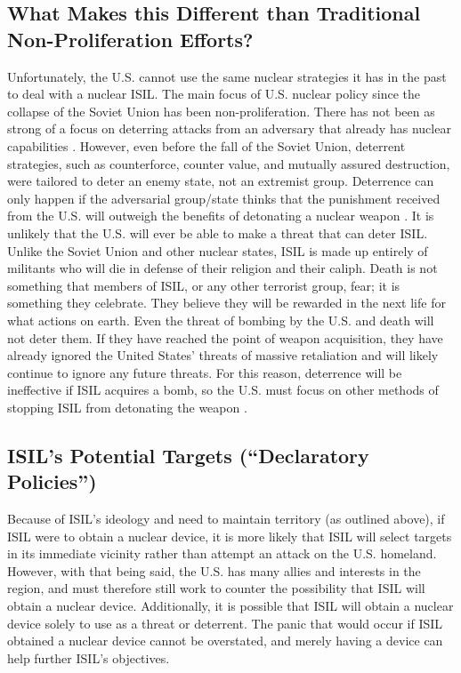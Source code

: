 \documentclass{report}
\begin{document}
\subsection{What Makes this Different than Traditional Non-Proliferation Efforts?}

Unfortunately, the U.S. cannot use the same nuclear strategies it has in the past to deal with a nuclear ISIL.  The main focus of U.S. nuclear policy since the collapse of the Soviet Union has been non-proliferation.  There has not been as strong of a focus on deterring attacks from an adversary that already has nuclear capabilities \cite{Bracken2013}. However, even before the fall of the Soviet Union, deterrent strategies, such as counterforce, counter value, and mutually assured destruction, were tailored to deter an enemy state, not an extremist group.  Deterrence can only happen if the adversarial group/state thinks that the punishment received from the U.S. will outweigh the benefits of detonating a nuclear weapon \cite{kaplan1991wizards}.  It is unlikely that the U.S. will ever be able to make a threat that can deter ISIL.  Unlike the Soviet Union and other nuclear states, ISIL is made up entirely of militants who will die in defense of their religion and their caliph.  Death is not something that members of ISIL, or any other terrorist group, fear; it is something they celebrate.  They believe they will be rewarded in the next life for what actions on earth.  Even the threat of bombing by the U.S. and death will not deter them.  If they have reached the point of weapon acquisition, they have already ignored the United States' threats of massive retaliation and will likely continue to ignore any future threats.  For this reason, deterrence will be ineffective if ISIL acquires a bomb, so the U.S. must focus on other methods of stopping ISIL from detonating the weapon \cite{Sanderson2015}.






\subsection{ISIL's Potential Targets (\enquote{Declaratory Policies})}

Because of ISIL's ideology and need to maintain territory (as outlined above), if ISIL were to obtain a nuclear device, it is more likely that ISIL will select targets in its immediate vicinity rather than attempt an attack on the U.S. homeland. However, with that being said, the U.S. has many allies and interests in the region, and must therefore still work to counter the possibility that ISIL will obtain a nuclear device. Additionally, it is possible that ISIL will obtain a nuclear device solely to use as a threat or deterrent. The panic that would occur if ISIL obtained a nuclear device cannot be overstated, and merely having a device can help further ISIL's objectives.
\end{document}
